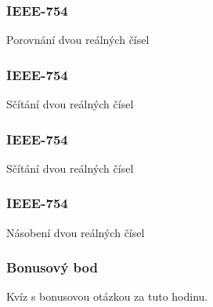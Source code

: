 \documentclass{beamer}
\begin{document}
\begin{frame}
\frametitle{IEEE-754}

Porovnání dvou reálných čísel

\end{frame}


\begin{frame}
\frametitle{IEEE-754}

Sčítání dvou reálných čísel

\end{frame}


\begin{frame}
\frametitle{IEEE-754}

Sčítání dvou reálných čísel

\end{frame}

\begin{frame}
\frametitle{IEEE-754}

Násobení dvou reálných čísel

\end{frame}

\begin{frame}
\frametitle{Bonusový bod}

Kvíz s bonusovou otázkou za tuto hodinu.

\end{frame}
\end{document}
